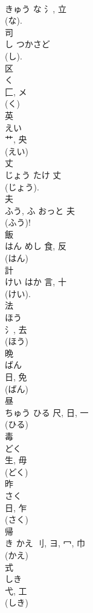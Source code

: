\documentclass[8pt]{extreport}
\begin{document}
\begin{CJK}{UTF8}{min}
\\	きゅう	な	氵, 立	
\\	(な). 
\\	司	
\\	し	つかさど		
\\	(し). 
\\	区	
\\	く	
\\	匚, メ	
\\	(く) 
\\	英	
\\	えい	
\\	艹, 央	
\\	(えい) 
\\	丈	
\\	じょう	たけ	丈	
\\	(じょう). 
\\	夫	
\\	ふう, ふ	おっと	夫	
\\	(ふう)! 
\\	飯	
\\	はん	めし	食, 反	
\\	(はん) 
\\	計	
\\	けい	はか	言, 十	
\\	(けい). 
\\	法	
\\	ほう	
\\	氵, 去	
\\	(ほう) 
\\	晩	
\\	ばん	
\\	日, 免	
\\	(ばん) 
\\	昼	
\\	ちゅう	ひる	尺, 日, 一	
\\	(ひる) 
\\	毒	
\\	どく	
\\	生, 毋	
\\	(どく) 
\\	昨	
\\	さく	
\\	日, 乍	
\\	(さく) 
\\	帰	
\\	き	かえ	刂, ヨ, 冖, 巾	
\\	(かえ) 
\\	式	
\\	しき	
\\	弋, 工	
\\	(しき) 

\end{CJK}
\end{document}
